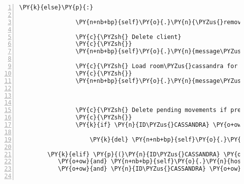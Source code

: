 \begin{Verbatim}[commandchars=\\\{\},numbers=left,firstnumber=1,stepnumber=1]
            \PY{k}{else}\PY{p}{:}

                \PY{n+nb+bp}{self}\PY{o}{.}\PY{n}{\PYZus{}remove\PYZus{}sentence}\PY{p}{(}\PY{n}{ID\PYZus{}CASSANDRA}\PY{p}{,} \PY{l+s}{\PYZsq{}}\PY{l+s}{Meine Flügel sind wieder heil, ich kann fliegen!}\PY{l+s}{\PYZsq{}}\PY{p}{)}

                \PY{c}{\PYZsh{} Delete client}
                \PY{c}{\PYZsh{}}
                \PY{n+nb+bp}{self}\PY{o}{.}\PY{n}{message\PYZus{}for\PYZus{}host}\PY{o}{.}\PY{n}{event\PYZus{}list}\PY{o}{.}\PY{n}{append}\PY{p}{(}\PY{n}{fabula}\PY{o}{.}\PY{n}{DeleteEvent}\PY{p}{(}\PY{n}{ID\PYZus{}CASSANDRA}\PY{p}{)}\PY{p}{)}

                \PY{c}{\PYZsh{} Load room\PYZus{}cassandra for Cassandra and spawn her at position (1, 2)}
                \PY{c}{\PYZsh{}}
                \PY{n+nb+bp}{self}\PY{o}{.}\PY{n}{message\PYZus{}for\PYZus{}host}\PY{o}{.}\PY{n}{event\PYZus{}list}\PY{o}{.}\PY{n}{extend}\PY{p}{(}\PY{n+nb+bp}{self}\PY{o}{.}\PY{n}{\PYZus{}load\PYZus{}room}\PY{p}{(}\PY{n}{ID\PYZus{}CASSANDRA}\PY{p}{,}
                                                                        \PY{l+s}{\PYZdq{}}\PY{l+s}{room\PYZus{}cassandra}\PY{l+s}{\PYZdq{}}\PY{p}{,}
                                                                        \PY{p}{(}\PY{l+m+mi}{1}\PY{p}{,} \PY{l+m+mi}{2}\PY{p}{)}\PY{p}{)}\PY{p}{)}

                \PY{c}{\PYZsh{} Delete pending movements if present}
                \PY{c}{\PYZsh{}}
                \PY{k}{if} \PY{n}{ID\PYZus{}CASSANDRA} \PY{o+ow}{in} \PY{n+nb+bp}{self}\PY{o}{.}\PY{n}{tries\PYZus{}to\PYZus{}move\PYZus{}dict}\PY{o}{.}\PY{n}{keys}\PY{p}{(}\PY{p}{)}\PY{p}{:}

                    \PY{k}{del} \PY{n+nb+bp}{self}\PY{o}{.}\PY{n}{tries\PYZus{}to\PYZus{}move\PYZus{}dict}\PY{p}{[}\PY{n}{ID\PYZus{}CASSANDRA}\PY{p}{]}

        \PY{k}{elif} \PY{p}{(}\PY{n}{ID\PYZus{}CASSANDRA} \PY{o+ow}{in} \PY{n+nb+bp}{self}\PY{o}{.}\PY{n}{host}\PY{o}{.}\PY{n}{room\PYZus{}by\PYZus{}client}\PY{o}{.}\PY{n}{keys}\PY{p}{(}\PY{p}{)}
           \PY{o+ow}{and} \PY{n+nb+bp}{self}\PY{o}{.}\PY{n}{host}\PY{o}{.}\PY{n}{room\PYZus{}by\PYZus{}client}\PY{p}{[}\PY{n}{ID\PYZus{}CASSANDRA}\PY{p}{]}\PY{o}{.}\PY{n}{identifier} \PY{o}{==} \PY{l+s}{\PYZdq{}}\PY{l+s}{room\PYZus{}cassandra}\PY{l+s}{\PYZdq{}}
           \PY{o+ow}{and} \PY{n}{ID\PYZus{}CASSANDRA} \PY{o+ow}{in} \PY{n+nb+bp}{self}\PY{o}{.}\PY{n}{host}\PY{o}{.}\PY{n}{room\PYZus{}by\PYZus{}client}\PY{p}{[}\PY{n}{ID\PYZus{}CASSANDRA}\PY{p}{]}\PY{o}{.}\PY{n}{entity\PYZus{}locations}\PY{o}{.}\PY{n}{keys}\PY{p}{(}\PY{p}{)}\PY{p}{)}\PY{p}{:}


\end{Verbatim}
